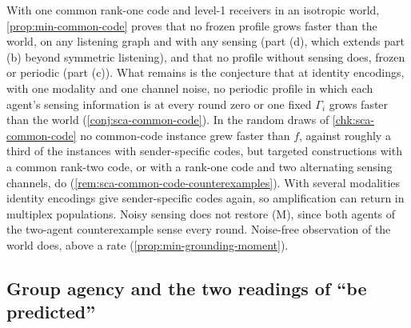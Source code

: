 With one common rank-one code and level-1 receivers in an isotropic world, \cref{prop:min-common-code} proves that no frozen profile grows faster than the world, on any listening graph and with any sensing (part (d), which extends part (b) beyond symmetric listening), and that no profile without sensing does, frozen or periodic (part (c)). What remains is the conjecture that at identity encodings, with one modality and one channel noise, no periodic profile in which each agent's sensing information is at every round zero or one fixed $\Gamma_i$ grows faster than the world (\cref{conj:sca-common-code}). In the random draws of \cref{chk:sca-common-code} no common-code instance grew faster than $f$, against roughly a third of the instances with sender-specific codes, but targeted constructions with a common rank-two code, or with a rank-one code and two alternating sensing channels, do (\cref{rem:sca-common-code-counterexamples}). With several modalities identity encodings give sender-specific codes again, so amplification can return in multiplex populations. Noisy sensing does not restore (M), since both agents of the two-agent counterexample sense every round. Noise-free observation of the world does, above a rate (\cref{prop:min-grounding-moment}).

\subsection{Group agency and the two readings of ``be predicted''}\label{sec:min-agency}


